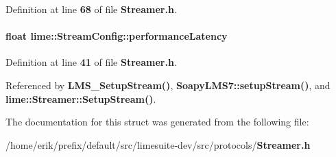 Definition at line {\bf 68} of file {\bf Streamer.\+h}.

\paragraph[{performance\+Latency}]{\setlength{\rightskip}{0pt plus 5cm}float lime\+::\+Stream\+Config\+::performance\+Latency}\label{structlime_1_1StreamConfig_adf64f7cb9a43d2966b227ddbdc678e98}


Definition at line {\bf 41} of file {\bf Streamer.\+h}.



Referenced by {\bf L\+M\+S\+\_\+\+Setup\+Stream()}, {\bf Soapy\+L\+M\+S7\+::setup\+Stream()}, and {\bf lime\+::\+Streamer\+::\+Setup\+Stream()}.



The documentation for this struct was generated from the following file\+:\begin{DoxyCompactItemize}
\item 
/home/erik/prefix/default/src/limesuite-\/dev/src/protocols/{\bf Streamer.\+h}\end{DoxyCompactItemize}
